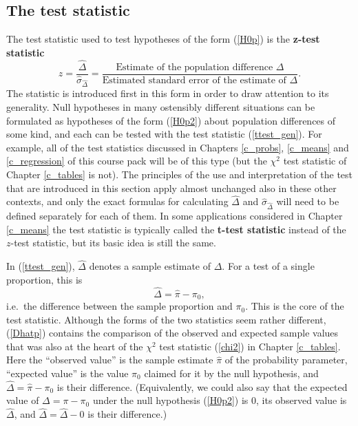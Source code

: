 \subsection{The test statistic}
\label{ss_probs_test1sample_teststatistic}

The test statistic used to test hypotheses of the form (\ref{H0p}) is
the \textbf{z-test statistic}
\begin{equation}
z=
\frac{\hat{\Delta}}{\hat{\sigma}_{\hat{\Delta}}}=
\frac{\text{Estimate of the population difference $\Delta$}}
{\text{Estimated standard error
of the estimate of $\Delta$}}.
\label{ttest_gen}
\end{equation}
The statistic is introduced first in this form
in order to draw attention to its generality.
Null hypotheses in many ostensibly different
situations can be formulated as hypotheses of the form
(\ref{H0p2}) about
population differences of some kind, and each can be tested with the test
statistic (\ref{ttest_gen}). For example, all of the test
statistics discussed in Chapters \ref{c_probs}, \ref{c_means} and
\ref{c_regression} of this course pack will be of this type (but the
$\chi^{2}$ test statistic of Chapter \ref{c_tables} is not). The
principles of the use and interpretation of the test that are introduced
in this section apply almost unchanged also in these other contexts, and
only the exact formulas for calculating $\hat{\Delta}$ and
$\hat{\sigma}_{\hat{\Delta}}$ will need to be defined separately for
each of them. In some applications considered in Chapter \ref{c_means}
the test statistic is typically called the \textbf{t-test statistic}
instead of the $z$-test statistic, but its basic idea is still the same.

In (\ref{ttest_gen}), $\hat{\Delta}$ denotes a sample estimate of
$\Delta$. For a test of a single proportion, this is
\begin{equation}
\hat{\Delta} = \hat{\pi}-\pi_{0},
\label{Dhatp}
\end{equation}
i.e.\ the difference between the sample proportion and $\pi_{0}$. This
is the core of the test statistic. Although the forms of the two
statistics seem rather different, (\ref{Dhatp}) contains the
comparison of the observed and expected sample values that was also at the
heart of the $\chi^{2}$ test statistic (\ref{chi2}) in Chapter
\ref{c_tables}. Here the ``observed value'' is the sample estimate $\hat{\pi}$
of the probability parameter, ``expected value'' is the value $\pi_{0}$
claimed for it by the null hypothesis, and
$\hat{\Delta}=\hat{\pi}-\pi_{0}$ is their difference. (Equivalently, we
could also say that the expected value of $\Delta=\pi-\pi_{0}$ under the null
hypothesis (\ref{H0p2}) is 0, its observed value is $\hat{\Delta}$, and
$\hat{\Delta}=\hat{\Delta}-0$ is their difference.)

